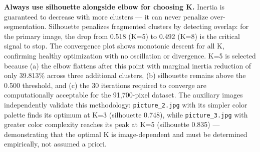 \begin{notebox}
\textbf{Always use silhouette alongside elbow for choosing K.} Inertia is guaranteed to decrease with more clusters — it can never penalize over-segmentation. Silhouette penalizes fragmented clusters by detecting overlap: for the primary image, the drop from 0.518 (K=5) to 0.492 (K=8) is the critical signal to stop. The convergence plot shows monotonic descent for all K, confirming healthy optimization with no oscillation or divergence. K=5 is selected because (a) the elbow flattens after this point with marginal inertia reduction of only 39.813\% across three additional clusters, (b) silhouette remains above the 0.500 threshold, and (c) the 30 iterations required to converge are computationally acceptable for the 91{,}700-pixel dataset. The auxiliary images independently validate this methodology: \texttt{picture\_2.jpg} with its simpler color palette finds its optimum at K=3 (silhouette 0.748), while \texttt{picture\_3.jpg} with greater color complexity reaches its peak at K=5 (silhouette 0.835) — demonstrating that the optimal K is image-dependent and must be determined empirically, not assumed a priori.
\end{notebox}
